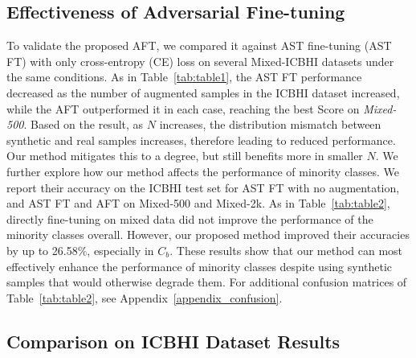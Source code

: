 \documentclass{article}
\begin{document}
\subsection{Effectiveness of Adversarial Fine-tuning}
To validate the proposed AFT, we compared it against AST fine-tuning (AST FT) with only cross-entropy (CE) loss on several Mixed-ICBHI datasets under the same conditions.
As in Table~\ref{tab:table1}, the AST FT performance decreased as the number of augmented samples in the ICBHI dataset increased, while the AFT outperformed it in each case, reaching the best Score on \emph{Mixed-500}.
Based on the result, as $N$ increases, the distribution mismatch between synthetic and real samples increases, therefore leading to reduced performance. Our method mitigates this to a degree, but still benefits more in smaller $N$. We further explore how our method affects the performance of minority classes. We report their accuracy on the ICBHI test set for AST FT with no augmentation, and AST FT and AFT on Mixed-500 and Mixed-2k.
As in Table~\ref{tab:table2}, directly fine-tuning on mixed data did not improve the performance of the minority classes overall. However, our proposed method improved their accuracies by up to 26.58\%, especially in $C_{b}$.
These results show that our method can most effectively enhance the performance of minority classes despite using synthetic samples that would otherwise degrade them.
For additional confusion matrices of Table~\ref{tab:table2}, see Appendix~\ref{appendix_confusion}.


\subsection{Comparison on ICBHI Dataset Results}
\end{document}
